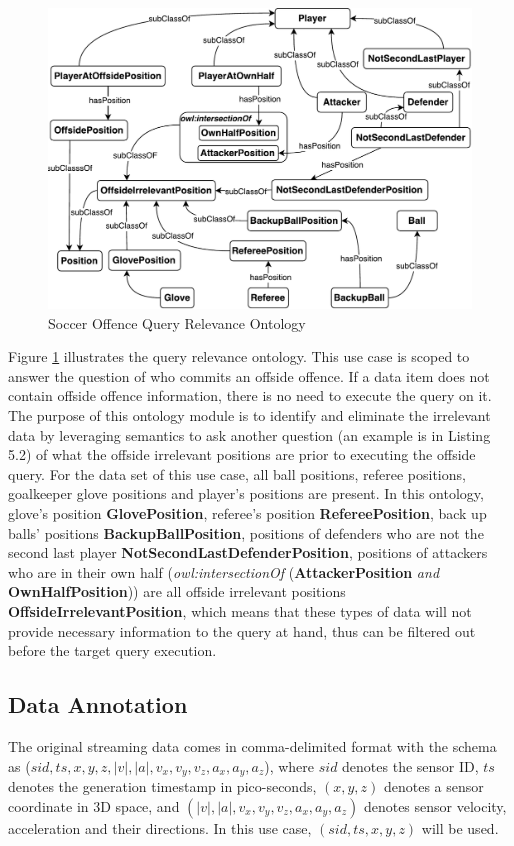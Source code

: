 \begin{figure}[!htbp]
	\centering
	\includegraphics[width=5in]{img/5-qronto}
	\caption{Soccer Offence Query Relevance Ontology}
	\label{fig:dlonto}
\end{figure}

Figure \ref{fig:dlonto} illustrates the query relevance ontology. 
This use case is scoped to answer the question of who commits an offside offence. 
If a data item does not contain offside offence information, there is no need to execute the query on it. 
The purpose of this ontology module is to identify and eliminate the irrelevant data by leveraging semantics to ask another question (an example is in Listing 5.2) of what the offside irrelevant positions are prior to executing the offside query.
For the data set of this use case, all ball positions, referee positions, goalkeeper glove positions and player's positions are present. 
In this ontology, glove's position \textbf{GlovePosition}, referee's position \textbf{RefereePosition}, back up balls' positions \textbf{BackupBallPosition}, positions of defenders who are not the second last player \textbf{NotSecondLastDefenderPosition}, positions of attackers who are in their own half (\textit{owl:intersectionOf} (\textbf{AttackerPosition} \textit{and} \textbf{OwnHalfPosition})) are all offside irrelevant positions \textbf{OffsideIrrelevantPosition}, which means that these types of data will not provide necessary information to the query at hand, thus can be filtered out before the target query execution. 
%
\subsection{Data Annotation}
The original streaming data comes in comma-delimited format with the schema as  ($sid, ts, x, y, z, \left|v\right|, \left|a\right|, v_{x}, v_{y}, v_{z}, a_{x}, a_{y}, a_{z}$), where $sid$ denotes the sensor ID, $ts$ denotes the generation timestamp in pico-seconds, $(x, y, z)$ denotes a sensor coordinate in 3D space, and $(\left|v\right|, \left|a\right|, v_{x}, v_{y}, v_{z}, a_{x}, a_{y}, a_{z})$ denotes sensor velocity, acceleration and their directions.
In this use case, $(sid, ts, x, y, z)$ will be used.

